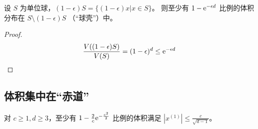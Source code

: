 \begin{theorem}
    设 $S$ 为单位球，$(1-\epsilon)S=\{(1-\epsilon)x|x\in S\}$。
则至少有 $1-\mathrm{e}^{-\epsilon d}$ 比例的体积分布在 $S \setminus (1-\epsilon)S$ （“球壳”）中。
\end{theorem}

\begin{proof}
    \[
	   \frac{V((1-\epsilon)S)}{V(S)}=(1-\epsilon)^{d}\le \mathrm{e}^{-\epsilon d}
    \]
\end{proof}

\subsection{体积集中在“赤道”}

\begin{theorem}
    对 $c\ge1, d\ge3$，至少有 $1-\frac{2}{c}\mathrm{e}^{-\frac{c^{2}}{2}}$ 比例的体积满足 $|x^{(1)}|\le\frac{c}{\sqrt{d-1}}$。
\end{theorem}

